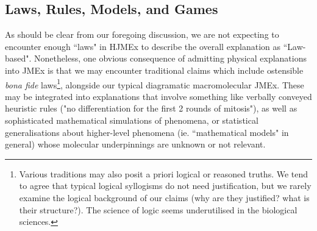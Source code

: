 \subsection{Laws, Rules, Models, and Games}
As should be clear from our foregoing discussion, we are not expecting to encounter enough ``laws" in HJMEx to describe the overall explanation as ``Law-based". Nonetheless, one obvious consequence of admitting physical explanations into JMEx is that we may encounter traditional claims which include ostensible \textit{bona fide} laws\footnote{Various traditions may also posit a priori logical or reasoned truths. We tend to agree that typical logical syllogisms do not need justification, but we rarely examine the logical background of our claims (why are they justified? what is their structure?). The science of logic seems underutilised in the biological sciences.}, alongside our typical diagramatic macromolecular JMEx. These may be integrated into explanations that involve something like verbally conveyed heuristic rules ("no differentiation for the first 2 rounds of mitosis"), as well as sophisticated mathematical simulations of phenomena, or statistical generalisations about higher-level phenomena (ie. ``mathematical models" in general) whose molecular underpinnings are unknown or not relevant.

